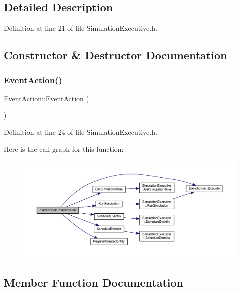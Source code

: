 \subsection{Detailed Description}


Definition at line 21 of file Simulation\+Executive.\+h.



\subsection{Constructor \& Destructor Documentation}
\mbox{\label{class_event_action_a9a8515b9069293b94b72a6863c48e6ba}} 
\subsubsection{\texorpdfstring{Event\+Action()}{EventAction()}}
{\footnotesize\ttfamily Event\+Action\+::\+Event\+Action (\begin{DoxyParamCaption}{ }\end{DoxyParamCaption})\hspace{0.3cm}{\ttfamily [inline]}}



Definition at line 24 of file Simulation\+Executive.\+h.

Here is the call graph for this function\+:
\nopagebreak
\begin{figure}[H]
\begin{center}
\leavevmode
\includegraphics[width=350pt]{class_event_action_a9a8515b9069293b94b72a6863c48e6ba_cgraph}
\end{center}
\end{figure}


\subsection{Member Function Documentation}
\mbox{\label{class_event_action_a62b9d07abb4ca8e7c078b076a1ab1a9f}} 
